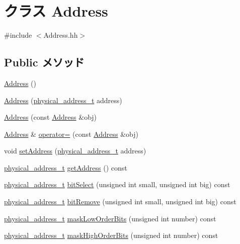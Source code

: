 \hypertarget{classAddress}{
\section{クラス Address}
\label{classAddress}
}


{\ttfamily \#include $<$Address.hh$>$}\subsection*{Public メソッド}
\begin{DoxyCompactItemize}
\item 
\hyperlink{classAddress_ac98de6c9250be1b4e3446d9989e058b3}{Address} ()
\item 
\hyperlink{classAddress_ab13b386b7f0bf74bab346a3f2cbde303}{Address} (\hyperlink{TypeDefines_8hh_a7901e1a365850c5ff38ec6e12b6b9ffc}{physical\_\-address\_\-t} address)
\item 
\hyperlink{classAddress_a3e2381cefd37090be9fda7e97116fe20}{Address} (const \hyperlink{classAddress}{Address} \&obj)
\item 
\hyperlink{classAddress}{Address} \& \hyperlink{classAddress_aa1132891400c01bf7857fb1cf4e55a25}{operator=} (const \hyperlink{classAddress}{Address} \&obj)
\item 
void \hyperlink{classAddress_a8febae9cef6a5c73aee5c73af61afc48}{setAddress} (\hyperlink{TypeDefines_8hh_a7901e1a365850c5ff38ec6e12b6b9ffc}{physical\_\-address\_\-t} address)
\item 
\hyperlink{TypeDefines_8hh_a7901e1a365850c5ff38ec6e12b6b9ffc}{physical\_\-address\_\-t} \hyperlink{classAddress_aa5c44fe637d09a708d70c4a689840cd0}{getAddress} () const 
\item 
\hyperlink{TypeDefines_8hh_a7901e1a365850c5ff38ec6e12b6b9ffc}{physical\_\-address\_\-t} \hyperlink{classAddress_a22669386ccc1e2491c7c46f55c37a038}{bitSelect} (unsigned int small, unsigned int big) const 
\item 
\hyperlink{TypeDefines_8hh_a7901e1a365850c5ff38ec6e12b6b9ffc}{physical\_\-address\_\-t} \hyperlink{classAddress_a3915ce6c78db893a57a516943f9796d1}{bitRemove} (unsigned int small, unsigned int big) const 
\item 
\hyperlink{TypeDefines_8hh_a7901e1a365850c5ff38ec6e12b6b9ffc}{physical\_\-address\_\-t} \hyperlink{classAddress_a9f50b73bd84b2fa8566f66416a04a1df}{maskLowOrderBits} (unsigned int number) const 
\item 
\hyperlink{TypeDefines_8hh_a7901e1a365850c5ff38ec6e12b6b9ffc}{physical\_\-address\_\-t} \hyperlink{classAddress_a81d4d297d2670a5d60ea08d23b2c7f96}{maskHighOrderBits} (unsigned int number) const 

\end{DoxyCompactItemize}
